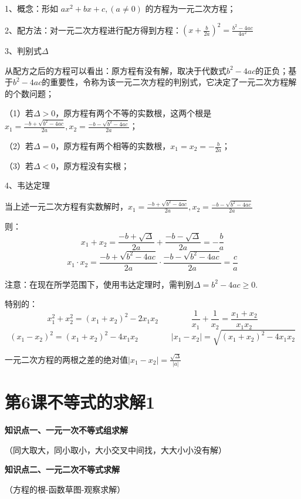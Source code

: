\documentclass[11pt,a4paper]{ctexbook}
\begin{document}
1、概念：形如 $ax^2+bx+c,(a \ne 0)$ 的方程为一元二次方程；\par
2、配方法：对一元二次方程进行配方得到方程：$\displaystyle(x + \frac{b}{2a})^2 = \frac{b^2-4ac}{4a^2} $ \par
3、判别式$\Delta$ \par
从配方之后的方程可以看出：原方程有没有解，取决于代数式$ b^2-4ac $的正负；基于$ b^2-4ac $的重要性，令称为该一元二次方程的判别式，它决定了一元二次方程解的个数问题；\par
（1）若$\Delta > 0$，原方程有两个不等的实数根，这两个根是$\displaystyle x_1 = \frac{-b+\sqrt{b^2-4ac}}{2a} , x_2 = \frac{-b-\sqrt{b^2-4ac}}{2a}$；\par
（2）若$\Delta = 0$，原方程有两个相等的实数根，$\displaystyle x_1 = x_2 = -\frac{b}{2a}$；\par
（3）若$\Delta < 0$，原方程没有实根；\par
4、韦达定理\par
当上述一元二次方程有实数解时，$\displaystyle x_1 = \frac{-b+\sqrt{b^2-4ac}}{2a} , x_2 = \frac{-b-\sqrt{b^2-4ac}}{2a}$ \par
则：$$ x_1+x_2=\frac{-b+\sqrt{\Delta}}{2a}+\frac{-b-\sqrt{\Delta}}{2a}=-\frac{b}{a}$$
$$ x_1 \cdot x_2=\frac{-b+\sqrt{b^2-4ac}}{2a} \cdot \frac{-b-\sqrt{b^2-4ac}}{2a}=  \frac{c}{a}$$

注意：在现在所学范围下，使用韦达定理时，需判别$\Delta = b^2-4ac \ge 0 $. \par
特别的：
$$x_1^2+x_2^2 = (x_1+x_2)^2-2x_1x_2 \qquad \qquad \frac{1}{x_1}+\frac{1}{x_2} = \frac{x_1+x_2}{x_1x_2}$$
$$(x_1-x_2)^2 = (x_1+x_2)^2-4x_1x_2 \qquad \qquad | x_1-x_2 | = \sqrt{(x_1+x_2)^2-4x_1x_2}$$
{一元二次方程的两根之差的绝对值$\displaystyle | x_1-x_2 | =  \frac{\sqrt{\Delta}}{|a|}$\par}


\clearpage
\section{第6课\quad 不等式的求解1}
\begin{formal}
    {\large \textbf{知识点一、一元一次不等式组求解}}
\end{formal}
（同大取大，同小取小，大小交叉中间找，大大小小没有解）

\begin{formal}
    {\large \textbf{知识点二、一元二次不等式求解}}
\end{formal}

（方程的根-函数草图-观察求解）
\end{document}
